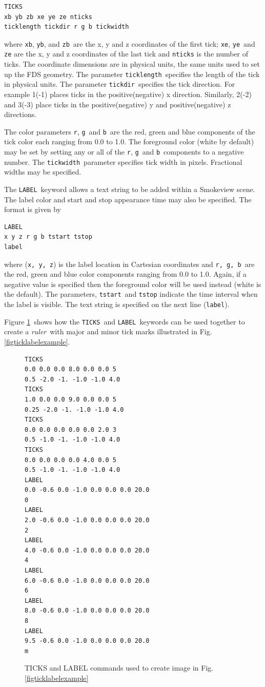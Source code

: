 \documentclass[11pt,twoside]{book}
\begin{document}
\begin{lstlisting}
TICKS
xb yb zb xe ye ze nticks
ticklength tickdir r g b tickwidth
\end{lstlisting}

\noindent where {\tt xb}, {\tt yb}, and {\tt zb}\ are the x, y and
z coordinates of the first tick; {\tt xe}, {\tt ye}\ and {\tt ze}
are the x, y and z coordinates of the last tick and {\tt nticks}
is the number of ticks. The coordinate dimensions are in physical
units, the same units used to set up the FDS geometry. The
parameter {\tt ticklength}\ specifies the length of the tick in
physical units. The parameter {\tt tickdir}\ specifies the tick
direction.  For example 1(-1) places ticks in the
positive(negative) x direction. Similarly, 2(-2) and 3(-3) place
ticks in the positive(negative) y and positive(negative) z
directions.

The color parameters {\tt r}, {\tt g}\ and {\tt b}\ are the
red, green and blue components of the tick color each
ranging from 0.0 to 1.0. The foreground color (white by
default) may be set by setting any or all of the {\tt r},
{\tt g}\ and {\tt b}\ components to a negative number. The
{\tt tickwidth}\ parameter specifies tick width in pixels.
Fractional widths may be specified.

The {\tt LABEL}\ keyword allows a text string to be added
within a Smokeview scene.  The label color and start and
stop appearance time may also be specified. The format is
given by

\begin{lstlisting}
LABEL
x y z r g b tstart tstop
label
\end{lstlisting}

\noindent where ({\tt x, y, z}) is the label location in Cartesian
coordinates and {\tt r, g, b}\ are the red, green and blue color
components ranging from 0.0 to 1.0.  Again, if a negative value is
specified then the foreground color will be used instead (white is
the default).  The parameters, {\tt tstart}\ and {\tt tstop}
indicate the time interval when the label is visible. The text
string is specified on the next line ({\tt label}).

Figure \ref{figticklabels}\ shows how the {\tt TICKS}\ and
{\tt LABEL}\ keywords can be used together to create a
{\em ruler}\ with major and minor tick marks illustrated in Fig.
\ref{figticklabelexample}.

\begin{figure}[bph]
{\small
\begin{lstlisting}
TICKS
0.0 0.0 0.0 8.0 0.0 0.0 5
0.5 -2.0 -1. -1.0 -1.0 4.0
TICKS
1.0 0.0 0.0 9.0 0.0 0.0 5
0.25 -2.0 -1. -1.0 -1.0 4.0
TICKS
0.0 0.0 0.0 0.0 0.0 2.0 3
0.5 -1.0 -1. -1.0 -1.0 4.0
TICKS
0.0 0.0 0.0 0.0 4.0 0.0 5
0.5 -1.0 -1. -1.0 -1.0 4.0
LABEL
0.0 -0.6 0.0 -1.0 0.0 0.0 0.0 20.0
0
LABEL
2.0 -0.6 0.0 -1.0 0.0 0.0 0.0 20.0
2
LABEL
4.0 -0.6 0.0 -1.0 0.0 0.0 0.0 20.0
4
LABEL
6.0 -0.6 0.0 -1.0 0.0 0.0 0.0 20.0
6
LABEL
8.0 -0.6 0.0 -1.0 0.0 0.0 0.0 20.0
8
LABEL
9.5 -0.6 0.0 -1.0 0.0 0.0 0.0 20.0
m
\end{lstlisting}
}
\caption{ TICKS and LABEL commands used to create image in Fig. \ref{figticklabelexample}}
\label{figticklabels}%
\end{figure}
\end{document}

